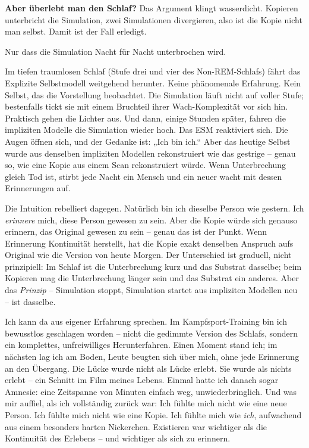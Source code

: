 \documentclass[11pt, twoside, openright]{book}
\begin{document}
\textbf{Aber überlebt man den Schlaf?} Das Argument klingt wasserdicht. Kopieren unterbricht die Simulation, zwei Simulationen divergieren, also ist die Kopie nicht man selbst. Damit ist der Fall erledigt.

Nur dass die Simulation Nacht für Nacht unterbrochen wird.

Im tiefen traumlosen Schlaf (Stufe drei und vier des Non-REM-Schlafs) fährt das Explizite Selbstmodell weitgehend herunter. Keine phänomenale Erfahrung. Kein Selbst, das die Vorstellung beobachtet. Die Simulation läuft nicht auf voller Stufe; bestenfalls tickt sie mit einem Bruchteil ihrer Wach-Komplexität vor sich hin. Praktisch gehen die Lichter aus. Und dann, einige Stunden später, fahren die impliziten Modelle die Simulation wieder hoch. Das ESM reaktiviert sich. Die Augen öffnen sich, und der Gedanke ist: „Ich bin ich.“ Aber das heutige Selbst wurde aus denselben impliziten Modellen rekonstruiert wie das gestrige -- genau so, wie eine Kopie aus einem Scan rekonstruiert würde. Wenn Unterbrechung gleich Tod ist, stirbt jede Nacht ein Mensch und ein neuer wacht mit dessen Erinnerungen auf.

Die Intuition rebelliert dagegen. Natürlich bin ich dieselbe Person wie gestern. Ich \textit{erinnere} mich, diese Person gewesen zu sein. Aber die Kopie würde sich genauso erinnern, das Original gewesen zu sein -- genau das ist der Punkt. Wenn Erinnerung Kontinuität herstellt, hat die Kopie exakt denselben Anspruch aufs Original wie die Version von heute Morgen. Der Unterschied ist graduell, nicht prinzipiell: Im Schlaf ist die Unterbrechung kurz und das Substrat dasselbe; beim Kopieren mag die Unterbrechung länger sein und das Substrat ein anderes. Aber das \textit{Prinzip} -- Simulation stoppt, Simulation startet aus impliziten Modellen neu -- ist dasselbe.

Ich kann da aus eigener Erfahrung sprechen. Im Kampfsport-Training bin ich bewusstlos geschlagen worden -- nicht die gedimmte Version des Schlafs, sondern ein komplettes, unfreiwilliges Herunterfahren. Einen Moment stand ich; im nächsten lag ich am Boden, Leute beugten sich über mich, ohne jede Erinnerung an den Übergang. Die Lücke wurde nicht als Lücke erlebt. Sie wurde als nichts erlebt -- ein Schnitt im Film meines Lebens. Einmal hatte ich danach sogar Amnesie: eine Zeitspanne von Minuten einfach weg, unwiederbringlich. Und was mir auffiel, als ich vollständig zurück war: Ich fühlte mich nicht wie eine neue Person. Ich fühlte mich nicht wie eine Kopie. Ich fühlte mich wie \textit{ich}, aufwachend aus einem besonders harten Nickerchen. Existieren war wichtiger als die Kontinuität des Erlebens -- und wichtiger als sich zu erinnern.
\end{document}
